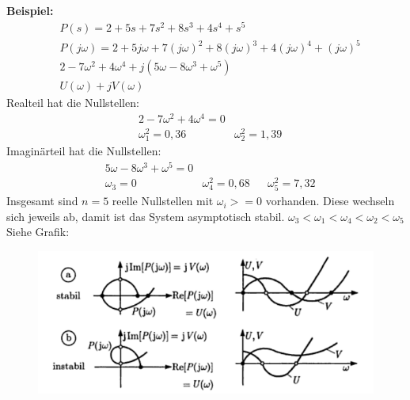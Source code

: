 \begin{tcolorbox}[colback=white!10!white,
                  colframe=green!30!black,
                  title=CLM-Kriterium]
    \textbf{Beispiel:}
    \begin{align*}
        &P(s) = 2 + 5s +7s^2 +8s^3 +4s^4 +s^5\\
        &P(j\omega) = 2 + 5j\omega + 7(j\omega)^2 +8 (j\omega)^3 + 4 (j\omega)^4 + (j\omega)^5\\
        &2-7\omega^2 +4\omega^4 + j (5\omega - 8\omega^3 +\omega^5)\\
        &U(\omega) + jV(\omega)
    \end{align*}
    Realteil hat die Nullstellen:
    \begin{align*}
        &2-7\omega^2 +4\omega^4 = 0 \\
        &\omega_1^2 = 0,36 & \omega_2^2= 1,39
    \end{align*}
    Imaginärteil hat die Nullstellen:
        \begin{align*}
            &5\omega - 8\omega^3 +\omega^5= 0 \\
            &\omega_3 = 0  & \omega_4^2= 0,68 & & \omega_5^2= 7,32 
        \end{align*}
    Insgesamt sind $n=5$ reelle Nullstellen mit $\omega_i >= 0$ vorhanden. 
    Diese wechseln sich jeweils ab, damit ist das System asymptotisch stabil. 
    $\omega_3 < \omega_1 < \omega_4 < \omega_2 < \omega_5$ Siehe Grafik:
    \begin{figure}[H]
        \centering
        \includegraphics[width=0.7\linewidth]{images/clm}
        \label{fig:clm}
    \end{figure}
\end{tcolorbox}
